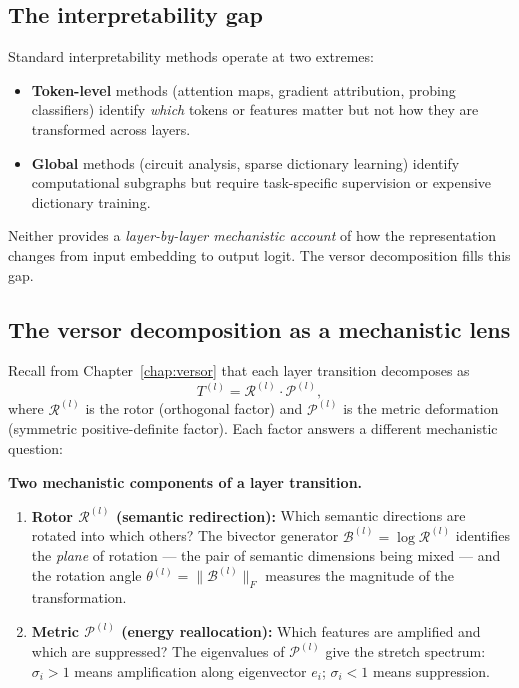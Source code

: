 \documentclass[11pt, twoside, openright]{memoir}
\newcommand{\rotor}[1]{\mathcal{R}^{(#1)}}  %
\newcommand{\bivec}[1]{\mathcal{B}^{(#1)}}  %
\newcommand{\metric}[1]{\mathcal{P}^{(#1)}} %
\numberwithin{equation}{chapter}
\begin{document}
\subsection{The interpretability gap}

Standard interpretability methods operate at two extremes:
\begin{itemize}[nosep]
\item \textbf{Token-level} methods (attention maps, gradient
  attribution, probing classifiers) identify \emph{which} tokens or
  features matter but not how they are transformed across layers.
\item \textbf{Global} methods (circuit analysis, sparse dictionary
  learning) identify computational subgraphs but require
  task-specific supervision or expensive dictionary training.
\end{itemize}
Neither provides a \emph{layer-by-layer mechanistic account} of how
the representation changes from input embedding to output logit.
The versor decomposition fills this gap.

\subsection{The versor decomposition as a mechanistic lens}

Recall from Chapter~\ref{chap:versor} that each layer transition
decomposes as
\begin{equation}
  T^{(l)} = \rotor{l} \cdot \metric{l},
\end{equation}
where $\rotor{l}$ is the rotor (orthogonal factor) and $\metric{l}$ is
the metric deformation (symmetric positive-definite factor).  Each
factor answers a different mechanistic question:

\begin{gabox}
\textbf{Two mechanistic components of a layer transition.}
\begin{enumerate}[nosep]
\item \textbf{Rotor $\rotor{l}$ (semantic redirection):} Which
  semantic directions are rotated into which others?  The bivector
  generator $\bivec{l} = \log \rotor{l}$ identifies the \emph{plane} of
  rotation --- the pair of semantic dimensions being mixed --- and the
  rotation angle $\theta^{(l)} = \|\bivec{l}\|_F$ measures the magnitude
  of the transformation.
\item \textbf{Metric $\metric{l}$ (energy reallocation):}  Which
  features are amplified and which are suppressed?  The eigenvalues of
  $\metric{l}$ give the stretch spectrum: $\sigma_i > 1$ means
  amplification along eigenvector $e_i$; $\sigma_i < 1$ means
  suppression.
\end{enumerate}
\end{gabox}
\end{document}
